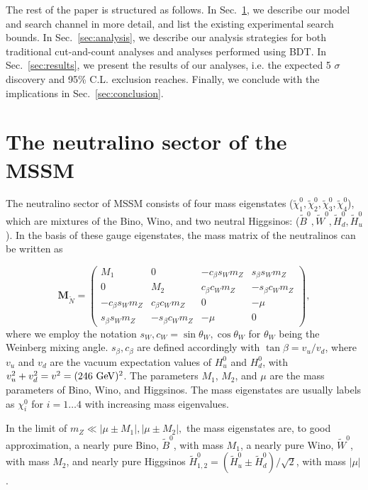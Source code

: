 \documentclass[a4paper,11pt]{article}
\renewcommand{\H}{\widetilde{H}^0}
\newcommand{\B}{\widetilde{B}^0}
\newcommand{\N}{\widetilde{\chi}^0}
\begin{document}
The rest of the paper is structured as follows. In Sec.~\ref{sec:model}, we describe our model and search channel in more
detail, and list the existing experimental search bounds. In Sec.~\ref{sec:analysis}, we describe our analysis strategies 
for both traditional cut-and-count analyses and analyses
performed using BDT. In Sec.~\ref{sec:results},
we present the results of our analyses, i.e. the expected 5 $\sigma$ discovery and 95\% C.L. exclusion
reaches. Finally, we conclude with the implications in Sec.~\ref{sec:conclusion}.

\section{The neutralino sector of the MSSM}
\label{sec:model}

 
The neutralino sector of MSSM consists of four mass eigenstates
($\N_1,\N_2,\N_3,\N_4$), which
are mixtures of the Bino, Wino, and two neutral Higgsinos: 
($\B,\widetilde{W}^0,\H_d,\H_u$). In the basis of these gauge eigenstates, the mass
matrix of the neutralinos can be written as

\newcommand{\cb}{ c_\beta}
\newcommand{\cw}{ c_W}
\newcommand{\sinb}{ s_\beta}
\newcommand{\sw}{ s_W}
\newcommand{\mz}{ m_Z}

\begin{equation}
\mathbf{M}_{\widetilde{N}}=
\begin{pmatrix}
  M_1 & 0 & -\cb\sw\mz & \sinb\sw\mz \\
  0 & M_2 & \cb\cw\mz & -\sinb\cw\mz \\
  -\cb\sw\mz & \cb\cw\mz & 0 & -\mu \\
  \sinb\sw\mz & -\sinb\cw\mz & -\mu & 0
\end{pmatrix},
\end{equation}
where we employ the notation $s_W, c_W = \sin\theta_W, \cos\theta_W$
for $\theta_W$ being the Weinberg mixing angle. $s_\beta, c_\beta$ are defined
accordingly with $\tan\beta= v_u/v_d$, where $v_u$ and $v_d$ are the vacuum
expectation values of $H_u^0$ and $H_d^0$, with $v_u^2+v_d^2=v^2=(246\ {\rm
GeV})^2$. The parameters $M_1$, $M_2$, and $\mu$ are the mass parameters of
Bino, Wino, and Higgsinos.  The mass eigenstates are usually labels as
$\chi_i^0$ for $i=1 \ldots 4$ with increasing mass eigenvalues.

In the limit of $\mz \ll |\mu\pm M_1|, |\mu\pm M_2|,$ the mass eigenstates
are, to good approximation, a nearly pure Bino, $\B$, with mass $M_1$,
a nearly pure Wino, $\widetilde{W}^0$, with mass $M_2$, and nearly pure Higgsinos
$\H_{1,2} = (\H_u \pm \H_d)/\sqrt{2}$, with mass
$|\mu|$. 
\end{document}
